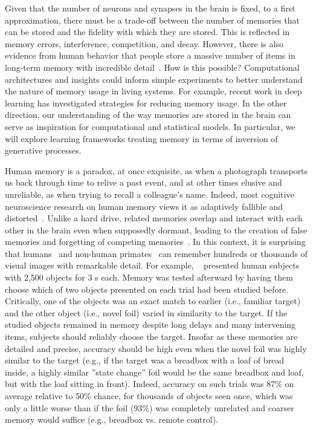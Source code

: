\def\argmin{\mathop{arg\,min}}

\label{sec:aim4}

Given that the number of neurons and synapses in the brain is fixed,
to a first approximation, there must be a trade-off between the number of
memories that can be stored and the fidelity with which they are
stored. This is reflected in memory errors, interference, competition,
and decay. However, there is also evidence from human behavior that
people store a massive number of items in long-term memory with
incredible detail~\citep{Brady:2011}. How is this possible?
Computational architectures and insights could inform simple
experiments to better understand the nature of memory usage in living
systems. For example, recent work in deep learning has investigated
strategies for reducing memory usage. In the other direction, our
understanding of the way memories are stored in the brain can serve as
inspiration for computational and statistical models. In particular,
we will explore learning frameworks treating memory in terms of
inversion of generative processes.

\biobackground{}Human memory is a paradox, at once exquisite, as when
a photograph transports us back through time to relive a past event,
and at other times elusive and unreliable, as when trying to recall a
colleague's name. Indeed, most cognitive neuroscience research on
human memory views it as adaptively fallible and
distorted~\citep{Schacter:2011}. Unlike a hard drive, related
memories overlap and interact with each other in the brain even when
supposedly dormant, leading to the creation of false memories and forgetting of competing memories~\citep{Kim:2014,Wimber:2015}. In
this context, it is surprising that
humans~\citep{Standing:1973,Brady:2008} and non-human
primates~\citep{Woloszyn:2012,Meyer:2018} can remember
hundreds or thousands of visual images with remarkable detail. For
example, ~\citet{Brady:2008} presented human subjects with 2,500
objects for 3 s each. Memory was tested afterward by having them
choose which of two objects presented on each trial had been studied
before. Critically, one of the objects was an exact match to earlier
(i.e., familiar target) and the other object (i.e., novel foil) varied
in similarity to the target. If the studied objects remained in
memory despite long delays and many intervening items, subjects
should reliably choose the target. Insofar as these memories
are detailed and precise, accuracy should be high even when the novel
foil was highly similar to the target (e.g., if the target
was a breadbox with a loaf of bread inside, a highly similar ''state
change'' foil would be the same breadbox and loaf, but with the loaf
sitting in front). Indeed, accuracy on such trials was 87\% on average
relative to 50\% chance, for thousands of objects seen once, which was
only a little worse than if the foil (93\%) was completely unrelated
and coarser memory would suffice (e.g., breadbox vs. remote control).

